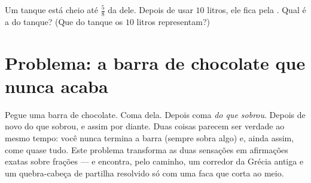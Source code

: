 \begin{exercise}[$\star\star\star$]\label{exo:g6:fractions:12}
Um tanque está cheio até $\frac58$ da  dele. Depois de usar
$10$ litros, ele fica pela . Qual é a  do tanque? (Que
 do tanque os $10$ litros representam?)
\end{exercise}

\section{Problema: a barra de chocolate que nunca acaba}

\begin{problem}
\label{pb:g6:fractions:1}
Pegue uma barra de chocolate. Coma  dela. Depois coma 
\emph{do que sobrou}. Depois de novo  do que sobrou, e assim por
diante. Duas coisas parecem ser verdade ao mesmo tempo: você nunca
termina a barra (sempre sobra algo) e, ainda assim, come quase tudo.
Este problema transforma as duas sensações em afirmações exatas sobre
frações --- e encontra, pelo caminho, um corredor da Grécia antiga e um
quebra-cabeça de partilha resolvido só com uma faca que corta ao meio.


\end{problem}
